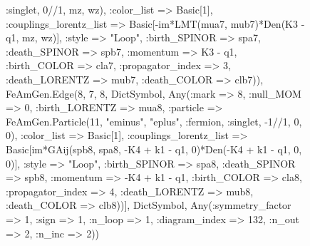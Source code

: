 \documentclass{revtex4}
\begin{document}
\begin{figure}[!htb]
\begin{center}
{:singlet, 0//1, mz, wz), :color_list => Basic[1], :couplings_lorentz_list => Basic[-im*LMT(mua7, mub7)*Den(K3 - q1, mz, wz)], :style => "Loop", :birth_SPINOR => spa7, :death_SPINOR => spb7, :momentum => K3 - q1, :birth_COLOR => cla7, :propagator_index => 3, :death_LORENTZ => mub7, :death_COLOR => clb7)), FeAmGen.Edge(8, 7, 8, Dict{Symbol, Any}(:mark => 8, :null_MOM => 0, :birth_LORENTZ => mua8, :particle => FeAmGen.Particle(11, "eminus", "eplus", :fermion, :singlet, -1//1, 0, 0), :color_list => Basic[1], :couplings_lorentz_list => Basic[im*GAij(spb8, spa8, -K4 + k1 - q1, 0)*Den(-K4 + k1 - q1, 0, 0)], :style => "Loop", :birth_SPINOR => spa8, :death_SPINOR => spb8, :momentum => -K4 + k1 - q1, :birth_COLOR => cla8, :propagator_index => 4, :death_LORENTZ => mub8, :death_COLOR => clb8))], Dict{Symbol, Any}(:symmetry_factor => 1, :sign => 1, :n_loop => 1, :diagram_index => 132, :n_out => 2, :n_inc => 2)) 
}
\end{center}
\end{figure}
\end{document}
